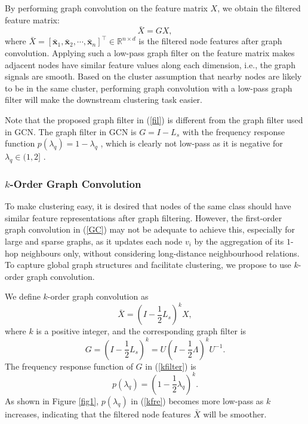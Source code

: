 \documentclass{article}
\begin{document}
By performing graph convolution on the feature matrix $X$, we obtain the filtered feature matrix:
\begin{equation}\label{GC}
  \bar{X}=GX,
\end{equation}
where $\bar{X}=[\bm {\bar{x}}_1, \bm {\bar{x}}_2, \cdots, \bm {\bar{x}}_n]^\top \in \mathbb{R}^{n\times d}$ is the filtered node features after graph convolution. Applying such a low-pass graph filter on the feature matrix makes adjacent nodes have similar feature values along each dimension, i.e., the graph signals are smooth. Based on the cluster assumption that nearby nodes are likely to be in the same cluster, performing graph convolution with a low-pass graph filter will make the downstream clustering task easier.

Note that the proposed graph filter in (\ref{fil}) is different from the graph filter used in GCN. The graph filter in GCN is $G=I-L_s$ with the frequency response function $p(\lambda_q)=1-\lambda_q$ \cite{Qimai19}, which is clearly not low-pass as it is negative for $\lambda_q \in (1,2]$ .

\subsubsection{$k$-Order Graph Convolution}

To make clustering easy, it is desired that nodes of the same class should have similar feature representations after graph filtering. However, the first-order graph convolution in (\ref{GC}) may not be adequate to achieve this, especially for large and sparse graphs, as it updates each node $v_i$ by the aggregation of its $1$-hop neighbours only, without considering long-distance neighbourhood relations. To capture global graph structures and facilitate clustering, we propose to use $k$-order graph convolution.



We define $k$-order graph convolution as
\begin{equation}\label{kGC}
  \bar{X}=(I-\frac12 L_s)^kX,
\end{equation}
where $k$ is a positive integer, and the corresponding graph filter is
\begin{equation}\label{kfilter}
G=(I-\frac12 L_s)^k=U(I-\frac12\Lambda)^kU^{-1}.
\end{equation}
The frequency response function of $G$ in (\ref{kfilter}) is
\begin{equation}\label{kfre}
p(\lambda_q)=(1-\frac12\lambda_q)^k.
\end{equation}
As shown in Figure \ref{fig1}, $p(\lambda_q)$ in (\ref{kfre}) becomes more low-pass as $k$ increases, indicating that the filtered node features $\bar{X}$ will be smoother.
\end{document}
